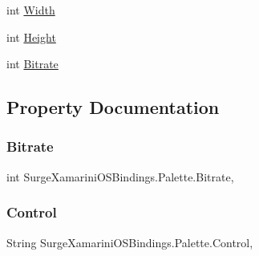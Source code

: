 \begin{DoxyCompactItemize}
int \hyperlink{interface_surge_xamarini_o_s_bindings_1_1_palette_a57aa40e8416635079e19e808507c1340}{Width}
\item 
int \hyperlink{interface_surge_xamarini_o_s_bindings_1_1_palette_a008a9018b67387ed688d4e8c5134f151}{Height}
\item 
int \hyperlink{interface_surge_xamarini_o_s_bindings_1_1_palette_afb427a7277370f4f46fa4d91f47def84}{Bitrate}
\end{DoxyCompactItemize}


\subsection{Property Documentation}
\mbox{\label{interface_surge_xamarini_o_s_bindings_1_1_palette_afb427a7277370f4f46fa4d91f47def84}} 
\subsubsection{\texorpdfstring{Bitrate}{Bitrate}}
{\footnotesize\ttfamily int Surge\+Xamarini\+O\+S\+Bindings.\+Palette.\+Bitrate\hspace{0.3cm}{\ttfamily [get]}, {\ttfamily [set]}}

\mbox{\label{interface_surge_xamarini_o_s_bindings_1_1_palette_a62003c6f6479d9e1b74dea73f0f47852}} 
\subsubsection{\texorpdfstring{Control}{Control}}
{\footnotesize\ttfamily String Surge\+Xamarini\+O\+S\+Bindings.\+Palette.\+Control\hspace{0.3cm}{\ttfamily [get]}, {\ttfamily [set]}}


